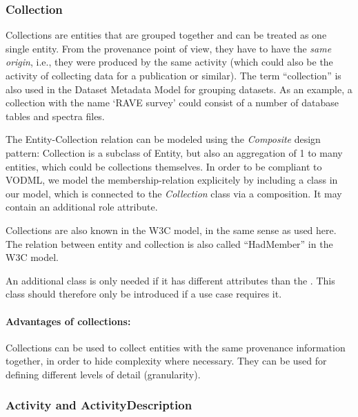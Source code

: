 \subsubsection{Collection}\label{sec:collection}
Collections are entities that are grouped together and can be treated as one single entity. 
From the provenance point of view, they have to have the \emph{same origin}, i.e., they were 
produced by the same activity (which could also be the activity of collecting
data for a publication or similar). The term ``collection'' is 
also used in the Dataset Metadata Model for grouping datasets.
As an example, a collection 
with the name `RAVE survey' could consist of a number of database tables and spectra files.


The Entity-Collection relation can be modeled using the \emph{Composite} design pattern: 
Collection is a subclass of Entity, but also an aggregation of 1 to many entities, 
which could be collections themselves. 
In order to be compliant to VODML, we model the membership-relation explicitely 
by including a  class in our model, which is connected to the
\emph{Collection} class via a composition. It may contain an additional role attribute.

Collections are also known in the W3C model, in the same sense as used here.
The relation between entity and collection is also called ``HadMember'' in the W3C model.

An additional class  is only 
needed if it has different attributes than 
the . This class should therefore only be introduced if a use case requires it.

\paragraph{Advantages of collections:} Collections can be used to collect entities with the same provenance information together, 
    in order to hide complexity where necessary. They can be used for defining 
    different levels of detail (granularity).





\subsubsection{Activity and ActivityDescription}

